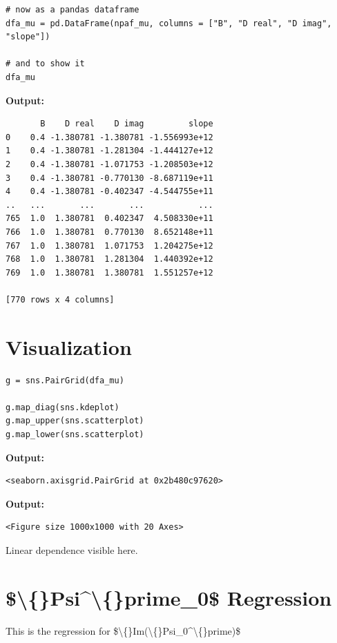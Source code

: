 \documentclass{article}
\begin{document}
\begin{lstlisting}
# now as a pandas dataframe
dfa_mu = pd.DataFrame(npaf_mu, columns = ["B", "D real", "D imag", "slope"])

# and to show it
dfa_mu\end{lstlisting}

\textbf{Output:}\begin{verbatim}
       B    D real    D imag         slope
0    0.4 -1.380781 -1.380781 -1.556993e+12
1    0.4 -1.380781 -1.281304 -1.444127e+12
2    0.4 -1.380781 -1.071753 -1.208503e+12
3    0.4 -1.380781 -0.770130 -8.687119e+11
4    0.4 -1.380781 -0.402347 -4.544755e+11
..   ...       ...       ...           ...
765  1.0  1.380781  0.402347  4.508330e+11
766  1.0  1.380781  0.770130  8.652148e+11
767  1.0  1.380781  1.071753  1.204275e+12
768  1.0  1.380781  1.281304  1.440392e+12
769  1.0  1.380781  1.380781  1.551257e+12

[770 rows x 4 columns]
\end{verbatim}

\section{Visualization}

\begin{lstlisting}
g = sns.PairGrid(dfa_mu)

g.map_diag(sns.kdeplot)
g.map_upper(sns.scatterplot)
g.map_lower(sns.scatterplot)\end{lstlisting}

\textbf{Output:}\begin{verbatim}
<seaborn.axisgrid.PairGrid at 0x2b480c97620>
\end{verbatim}

\textbf{Output:}\begin{verbatim}
<Figure size 1000x1000 with 20 Axes>
\end{verbatim}

Linear dependence visible here.

\section{\$\textbackslash\{\}Psi\textasciicircum{}\textbackslash\{\}prime\_0\$ Regression}

This is the regression for \$\textbackslash\{\}Im(\textbackslash\{\}Psi\_0\textasciicircum{}\textbackslash\{\}prime)\$
\end{document}
